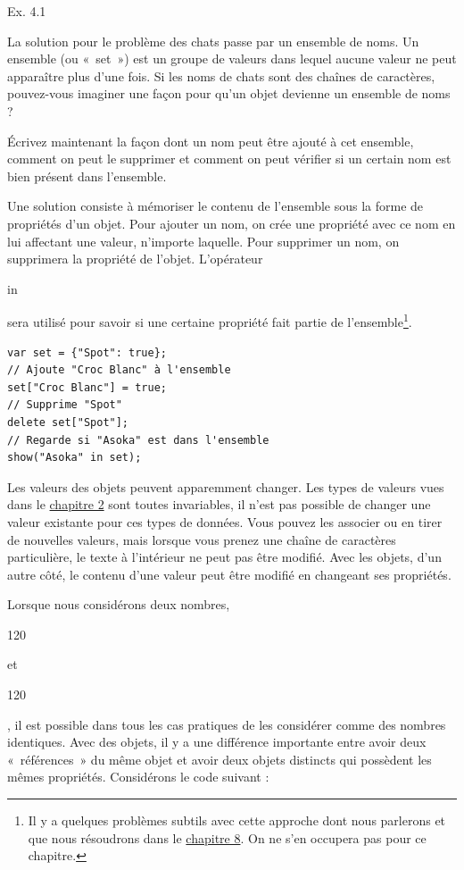 \documentclass{FramateX}
\renewcommand{\texttt}[1]{\begin{sffamily}{#1}\end{sffamily}}
\begin{document}
Ex. 4.1

La solution pour le problème des chats passe par un ensemble de noms. Un
ensemble (ou «~set~») est un groupe de valeurs dans lequel aucune valeur
ne peut apparaître plus d'une fois. Si les noms de chats sont des
chaînes de caractères, pouvez-vous imaginer une façon pour qu'un objet
devienne un ensemble de noms ?

Écrivez maintenant la façon dont un nom peut être ajouté à cet ensemble,
comment on peut le supprimer et comment on peut vérifier si un certain
nom est bien présent dans l'ensemble.

Une solution consiste à mémoriser le contenu de l'ensemble sous la forme
de propriétés d'un objet. Pour ajouter un nom, on crée une propriété
avec ce nom en lui affectant une valeur, n'importe laquelle. Pour
supprimer un nom, on supprimera la propriété de l'objet. L'opérateur
\texttt{in} sera utilisé pour savoir si une certaine propriété fait
partie de l'ensemble\footnote{Il y a quelques problèmes subtils avec cette approche dont nous parlerons et que nous résoudrons dans le \href{chapter8.html}{chapitre 8}. On ne s'en occupera pas pour ce chapitre.}.

\begin{lstlisting}
var set = {"Spot": true};
// Ajoute "Croc Blanc" à l'ensemble
set["Croc Blanc"] = true;
// Supprime "Spot"
delete set["Spot"];
// Regarde si "Asoka" est dans l'ensemble
show("Asoka" in set);
\end{lstlisting}
\begin{center}\end{center}

Les valeurs des objets peuvent apparemment changer. Les types de valeurs
vues dans le \href{chapter2.html}{chapitre 2} sont toutes invariables,
il n'est pas possible de changer une valeur existante pour ces types de
données. Vous pouvez les associer ou en tirer de nouvelles valeurs, mais
lorsque vous prenez une chaîne de caractères particulière, le texte à
l'intérieur ne peut pas être modifié. Avec les objets, d'un autre côté,
le contenu d'une valeur peut être modifié en changeant ses propriétés.

Lorsque nous considérons deux nombres, \texttt{120} et \texttt{120}, il
est possible dans tous les cas pratiques de les considérer comme des
nombres identiques. Avec des objets, il y a une différence importante
entre avoir deux «~références~» du même objet et avoir deux objets
distincts qui possèdent les mêmes propriétés. Considérons le code
suivant :
\end{document}
